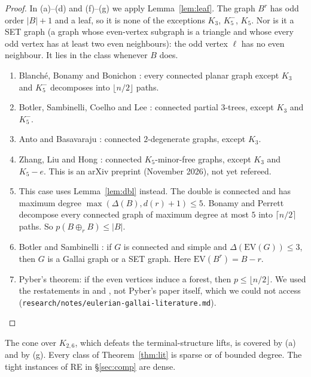 \documentclass[11pt]{amsart}
\theoremstyle{definition}
\begin{document}
\begin{proof}
In (a)--(d) and (f)--(g) we apply Lemma~\ref{lem:leaf}. The graph $B^r$ has odd order $|B|+1$ and a leaf,
so it is none of the exceptions $K_3$, $K_5^-$, $K_5$. Nor is it a SET graph (a graph whose
even-vertex subgraph is a triangle and whose every odd vertex has at least two even neighbours): the odd
vertex $\ell$ has no even neighbour. It lies in the class whenever $B$ does.
\begin{enumerate}[label=(\alph*)]
\item Blanch\'e, Bonamy and Bonichon \cite[Thm.~1.2]{BBB}: every connected planar graph except $K_3$ and
$K_5^-$ decomposes into $\lfloor n/2\rfloor$ paths.
\item Botler, Sambinelli, Coelho and Lee \cite[Thm.~3.2]{BSCL}: connected partial $3$-trees, except
$K_3$ and $K_5^-$.
\item Anto and Basavaraju \cite[Thm.~1]{AB}: connected $2$-degenerate graphs, except $K_3$.
\item Zhang, Liu and Hong \cite[Thm.~1.1]{ZLH}: connected $K_5$-minor-free graphs, except $K_3$ and
$K_5-e$. This is an arXiv preprint (November 2026), not yet refereed.
\item This case uses Lemma~\ref{lem:dbl} instead. The double is connected and has maximum degree
$\max(\Delta(B),d(r)+1)\le 5$. Bonamy and Perrett \cite[Thm.~1.3]{BP} decompose every connected graph
of maximum degree at most $5$ into $\lceil n/2\rceil$ paths. So $p(B\oplus_rB)\le|B|$.
\item Botler and Sambinelli \cite[Thm.~13]{BS}: if $G$ is connected and simple and
$\Delta(\mathrm{EV}(G))\le3$, then $G$ is a Gallai graph or a SET graph. Here $\mathrm{EV}(B^r)=B-r$.
\item Pyber's theorem: if the even vertices induce a forest, then $p\le\lfloor n/2\rfloor$. We used the
restatements in \cite[Thm.~2(b)]{BS} and \cite{BP}, not Pyber's paper itself, which we could not access
(\texttt{research/notes/eulerian-gallai-literature.md}).
\end{enumerate}
\end{proof}

The cone over $K_{2,6}$, which defeats the terminal-structure lifts, is covered by (a) and by (g).
Every class of Theorem~\ref{thm:lit} is sparse or of bounded degree. The tight instances of RE in
\S\ref{sec:comp} are dense.
\end{document}
